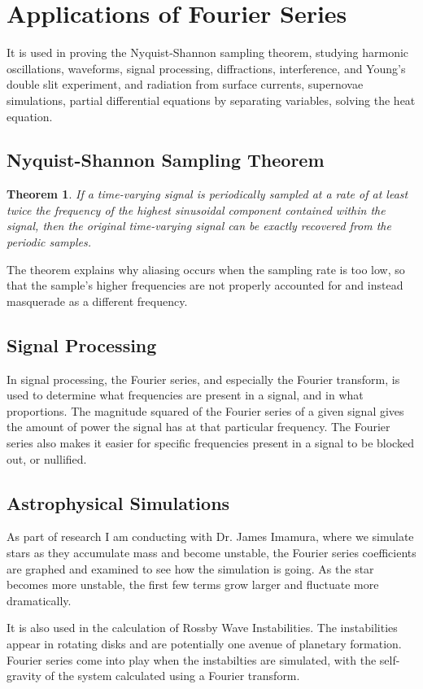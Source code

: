 \documentclass{article}
\newtheorem{theorem}{Theorem}
\begin{document}
\section{Applications of Fourier Series}
It is used in proving the Nyquist-Shannon sampling theorem,
studying harmonic oscillations, waveforms, signal processing,
diffractions, interference, and Young's double slit experiment,
and radiation from surface currents, supernovae simulations,
partial differential equations by separating variables,
solving the heat equation.

\subsection{Nyquist-Shannon Sampling Theorem}
\begin{theorem}
	If a time-varying signal is periodically sampled at a rate of at least twice the frequency of the highest sinusoidal component contained within the signal, then the original time-varying signal can be exactly recovered from the periodic samples.
\end{theorem}
The theorem explains why aliasing occurs when the sampling rate is too low, so that the sample's higher frequencies are not properly accounted for and instead masquerade as a different frequency.
\subsection{Signal Processing}
In signal processing, the Fourier series, and especially the Fourier transform, is used to determine what frequencies are present in a signal, and in what proportions. The magnitude squared of the Fourier series of a given signal gives the amount of power the signal has at that particular frequency. The Fourier series also makes it easier for specific frequencies present in a signal to be blocked out, or nullified.
\subsection{Astrophysical Simulations}
As part of research I am conducting with Dr. James Imamura, where we simulate stars as they accumulate mass and become unstable, the Fourier series coefficients are graphed and examined to see how the simulation is going. As the star becomes more unstable, the first few terms grow larger and fluctuate more dramatically.

It is also used in the calculation of Rossby Wave Instabilities. The instabilities appear in rotating disks and are potentially one avenue of planetary formation. Fourier series come into play when the instabilties are simulated, with the self-gravity of the system calculated using a Fourier transform.
\end{document}
